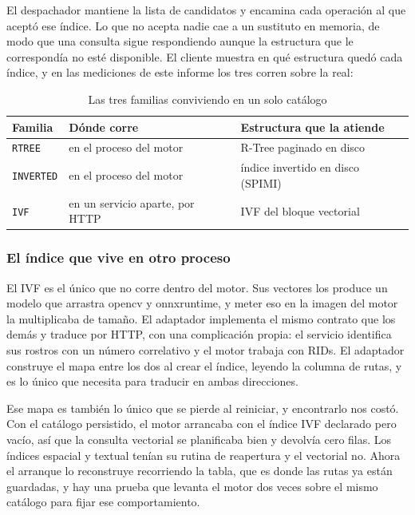 \documentclass[a4paper,12pt]{article}
\begin{document}
El despachador mantiene la lista de candidatos y encamina cada operación al que
aceptó ese índice. Lo que no acepta nadie cae a un sustituto en memoria, de modo
que una consulta sigue respondiendo aunque la estructura que le correspondía no
esté disponible. El cliente muestra en qué estructura quedó cada índice, y en
las mediciones de este informe los tres corren sobre la real:

\begin{table}[H]
\centering
\caption{Las tres familias conviviendo en un solo catálogo}
\begin{tabularx}{\textwidth}{@{}llX@{}}
\toprule
\textbf{Familia} & \textbf{Dónde corre} & \textbf{Estructura que la atiende} \\
\midrule
\texttt{RTREE} & en el proceso del motor & R-Tree paginado en disco \\
\texttt{INVERTED} & en el proceso del motor & índice invertido en disco (SPIMI) \\
\texttt{IVF} & en un servicio aparte, por HTTP & IVF del bloque vectorial \\
\bottomrule
\end{tabularx}
\end{table}

\subsubsection{El índice que vive en otro proceso}

El IVF es el único que no corre dentro del motor. Sus vectores los produce un
modelo que arrastra opencv y onnxruntime, y meter eso en la imagen del motor la
multiplicaba de tamaño. El adaptador implementa el mismo contrato que los demás
y traduce por HTTP, con una complicación propia: el servicio identifica sus
rostros con un número correlativo y el motor trabaja con RIDs. El adaptador
construye el mapa entre los dos al crear el índice, leyendo la columna de rutas,
y es lo único que necesita para traducir en ambas direcciones.

Ese mapa es también lo único que se pierde al reiniciar, y encontrarlo nos costó.
Con el catálogo persistido, el motor arrancaba con el índice IVF declarado pero
vacío, así que la consulta vectorial se planificaba bien y devolvía cero filas.
Los índices espacial y textual tenían su rutina de reapertura y el vectorial no.
Ahora el arranque lo reconstruye recorriendo la tabla, que es donde las rutas ya
están guardadas, y hay una prueba que levanta el motor dos veces sobre el mismo
catálogo para fijar ese comportamiento.
\end{document}
